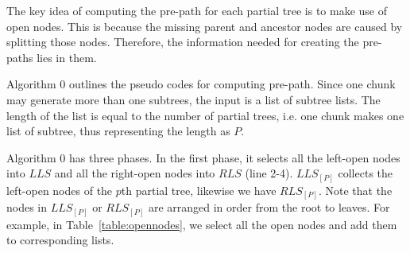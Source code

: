 The key idea of computing the pre-path for each partial tree is to make use
of open nodes. This is because the missing parent and ancestor nodes are caused
by splitting those nodes. Therefore, the information needed for creating the
pre-paths lies in them.

Algorithm 0 outlines the pseudo codes for computing pre-path. Since one chunk
may generate more than one subtrees, the input is a list of subtree lists. The
length of the list is equal to the number of partial trees, i.e. one chunk makes
one list of subtree, thus representing the length as $P$.

Algorithm 0 has three phases. In the first phase, it selects all the left-open
nodes into $LLS$ and all the right-open nodes into $RLS$ (line 2-4). $LLS_{[P]}$
collects the left-open nodes of the $p$th partial tree, likewise we have
$RLS_{[P]}$. Note that the nodes in $LLS_{[P]}$ or $RLS_{[P]}$ are arranged in
order from the root to leaves. For example, in Table~\ref{table:opennodes}, we
select all the open nodes and add them to corresponding lists.

